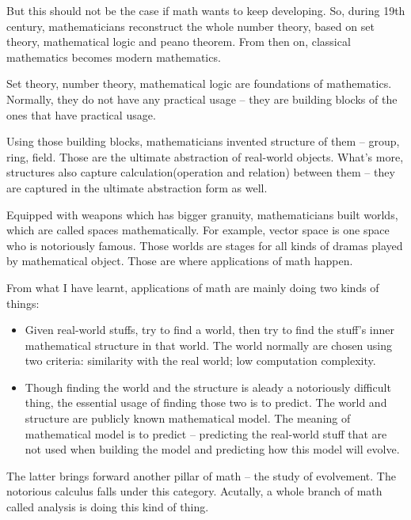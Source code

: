 \documentclass[a4paper]{book}
\begin{document}
    But this should not be the case if math wants to keep developing.
    So, during 19th century, mathematicians reconstruct the whole
    number theory, based on set theory, mathematical logic and peano
    theorem. From then on, classical mathematics becomes modern
    mathematics.

    Set theory, number theory, mathematical logic are foundations of
    mathematics. Normally, they do not have any practical usage -- they
    are building blocks of the ones that have practical usage.

    Using those building blocks, mathematicians invented structure of
    them -- group, ring, field. Those are the ultimate abstraction of
    real-world objects. What's more, structures also capture
    calculation(operation and relation) between them -- they are
    captured in the ultimate abstraction form as well.

    Equipped with weapons which has bigger granuity, mathematicians built
    worlds, which are called spaces mathematically. For example, vector
    space is one space who is notoriously famous. Those worlds are stages
    for all kinds of dramas played by mathematical object. Those are
    where applications of math happen.

    From what I have learnt, applications of math are mainly doing two
    kinds of things: 
    
    \begin{itemize}
      \item
        Given real-world stuffs, try to find a world, then try to find
        the stuff's inner mathematical structure in that world. The
        world normally are chosen using two criteria: similarity with
        the real world; low computation complexity.
      \item
        Though finding the world and the structure is aleady a
        notoriously difficult thing, the essential usage of finding
        those two is to predict. The world and structure are publicly
        known mathematical model. The meaning of mathematical model is
        to predict -- predicting the real-world stuff that are not used
        when building the model and predicting how this model will
        evolve.
    \end{itemize}

    The latter brings forward another pillar of math -- the study of
    evolvement. The notorious calculus falls under this category.
    Acutally, a whole branch of math called analysis is doing this kind
    of thing.
\end{document}
